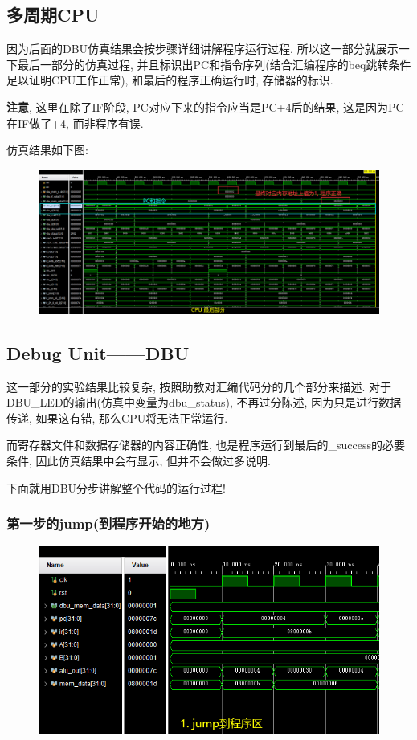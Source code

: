 \documentclass[UTF8]{article}
\begin{document}
\subsection{多周期CPU}
因为后面的DBU仿真结果会按步骤详细讲解程序运行过程, 所以这一部分就展示一下最后一部分的仿真过程, 并且标识出PC和指令序列(结合汇编程序的beq跳转条件足以证明CPU工作正常), 和最后的程序正确运行时, 存储器的标识.\par
\textbf{注意}, 这里在除了IF阶段, PC对应下来的指令应当是PC+4后的结果, 这是因为PC在IF做了+4, 而非程序有误.\par
仿真结果如下图:\par
\begin{figure}[H]
	\centering
	\includegraphics[width=\linewidth]{cpu.png}
\end{figure}
\subsection{Debug Unit——DBU}
这一部分的实验结果比较复杂, 按照助教对汇编代码分的几个部分来描述.
对于DBU\_LED的输出(仿真中变量为dbu\_status), 不再过分陈述, 因为只是进行数据传递, 如果这有错, 那么CPU将无法正常运行.\par
而寄存器文件和数据存储器的内容正确性, 也是程序运行到最后的\_success的必要条件, 因此仿真结果中会有显示, 但并不会做过多说明.\par
下面就用DBU分步讲解整个代码的运行过程!\par
\subsubsection{第一步的jump(到程序开始的地方)}
\begin{figure}[H]
	\centering
	\includegraphics[width=\linewidth]{CPU_1_jump.png}
\end{figure}
\end{document}
